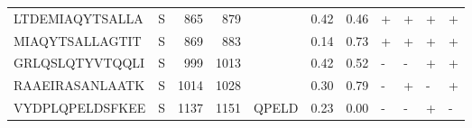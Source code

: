 \begin{tabular}{llrrlrrllll}
LTDEMIAQYTSALLA &       S &    865 &   879 &                    &            0.42 &             0.46 &      + &       + &      + &       + \\
MIAQYTSALLAGTIT &       S &    869 &   883 &                    &            0.14 &             0.73 &      + &       + &      + &       + \\
GRLQSLQTYVTQQLI &       S &    999 &  1013 &                    &            0.42 &             0.52 &      - &       - &      + &       + \\
RAAEIRASANLAATK &       S &   1014 &  1028 &                    &            0.30 &             0.79 &      - &       + &      - &       + \\
VYDPLQPELDSFKEE &       S &   1137 &  1151 &              QPELD &            0.23 &             0.00 &      - &       - &      + &       - \\
\bottomrule
\end{tabular}
